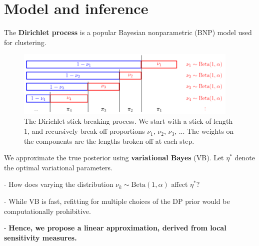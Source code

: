 \documentclass[a0,plainsections,30pt]{sciposter}\usepackage[]{graphicx}\usepackage[]{color}
\begin{document}
\begin{minipage}[t]{0.45\textwidth}
\section*{Model and inference }
\vspace{-0.3in}

The \textbf{Dirichlet process} is a popular Bayesian nonparametric
(BNP) model used for clustering.

\begin{figure}[!h]
\centering
\includegraphics[width = 0.95\textwidth]{./static_images/DP_stick_breaking.png}
\caption{The Dirichlet stick-breaking process. We start with a stick of
length 1, and recursively break off proportions $\nu_1$, $\nu_2$, $\nu_3$, ...
The weights on the components are the lengths broken off at each step.}
\setlength{\textfloatsep}{-10pt}
\end{figure}
%
We approximate the true posterior using \textbf{variational Bayes} (VB). Let $\eta^*$ denote the optimal variational parameters.
%
%
%
%
%

\begin{mdframed}[style=MyFrame]
- How does varying the distribution $\nu_k \sim \text{Beta}(1, \alpha)$ affect $\eta^*$?

- While VB is fast, refitting for multiple choices of the DP prior would be
computationally prohibitive.

- {\bf Hence, we propose a linear approximation, derived from local sensitivity measures. }
\end{mdframed}

\vspace{-0.6in}

\end{minipage}
\end{document}
